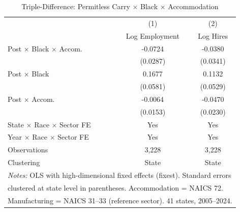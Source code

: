 \begin{table}[t]
\centering
\caption{Triple-Difference: Permitless Carry $\times$ Black $\times$ Accommodation}
\label{tab:ddd}
\begin{tabular}{lcc}
\hline\hline
 & (1) & (2) \\
 & Log Employment & Log Hires \\
\hline
Post $\times$ Black $\times$ Accom. & -0.0724 & -0.0380 \\
 & (0.0287) & (0.0341) \\
Post $\times$ Black & 0.1677 & 0.1132 \\
 & (0.0581) & (0.0529) \\
Post $\times$ Accom. & -0.0064 & -0.0470 \\
 & (0.0153) & (0.0230) \\
\hline
State $\times$ Race $\times$ Sector FE & Yes & Yes \\
Year $\times$ Race $\times$ Sector FE & Yes & Yes \\
Observations & 3,228 & 3,228 \\
Clustering & State & State \\
\hline
\multicolumn{3}{l}{\footnotesize \textit{Notes:} OLS with high-dimensional fixed effects (fixest). Standard errors} \\
\multicolumn{3}{l}{\footnotesize clustered at state level in parentheses. Accommodation = NAICS 72.} \\
\multicolumn{3}{l}{\footnotesize Manufacturing = NAICS 31--33 (reference sector). 41 states, 2005--2024.} \\
\hline\hline
\end{tabular}
\end{table}

